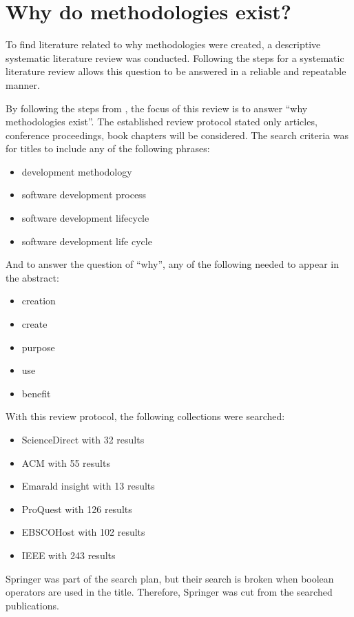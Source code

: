 \section{Why do methodologies exist?}
\label{sec:meth_why}
To find literature related to why methodologies were created, a descriptive systematic literature review was conducted.
Following the steps for a systematic literature review allows this question to be answered in a reliable and repeatable manner. \cite{xiao_2017}

By following the steps from \cite{xiao_2017}, the focus of this review is to answer ``why methodologies exist''.
The established review protocol stated only articles, conference proceedings, book chapters will be considered.
The search criteria was for titles to include any of the following phrases:
\begin{itemize}
    \item development methodology
    \item software development process
    \item software development lifecycle
    \item software development life cycle
\end{itemize}

And to answer the question of ``why'', any of the following needed to appear in the abstract:
\begin{itemize}
    \item creation
    \item create
    \item purpose
    \item use
    \item benefit
\end{itemize}

With this review protocol, the following collections were searched:
\begin{itemize}
    \item ScienceDirect with 32 results
    \item ACM with 55 results
    \item Emarald insight with 13 results
    \item ProQuest with 126 results
    \item EBSCOHost with 102 results
    \item IEEE with 243 results
\end{itemize}

Springer was part of the search plan, but their search is broken when boolean operators are used in the title.
Therefore, Springer was cut from the searched publications.

